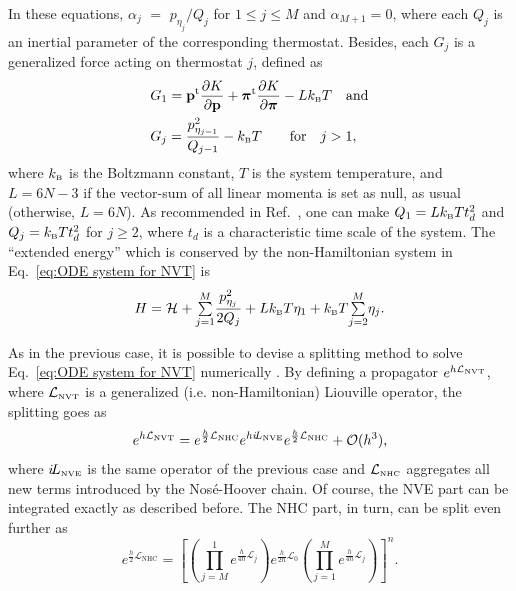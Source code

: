 \documentclass[journal=jctcce,manuscript=article,layout=twocolumn]{achemso}
\newcommand{\vt}[1]{\boldsymbol{\mathbf{#1}}}   %
\newcommand{\tr}[1]{#1^\text{t}}                %
\newcommand{\diff}[2]{\frac{\partial #1}{\partial #2}} %
\newcommand{\Ham}[1]{{\mathcal H}_\text{#1}}    %
\newcommand{\Liu}[1]{i\!L_\text{#1}}            %
\newcommand{\timestep}{h}
\newcommand{\modified}[1]{\widetilde{#1}}
\begin{document}
In these equations, $\alpha_j$ $=$ ${p_{\eta_j}}/{Q_j}$ for $1 \leq j \le M$ and $\alpha_{M+1} = 0$, where each $Q_j$ is an inertial parameter of the corresponding thermostat. Besides, each $G_j$ is a generalized force acting on thermostat $j$, defined as
\begin{subequations}
\begin{align}
\label{eq:generalized force NVT}
&G_1 = \tr{\vt p} \diff{K}{\vt p} + \tr{\vt \pi} \diff{K}{\vt \pi} - L k_\text{\tiny B} T \quad \text{and}\\
&G_j = \frac{p_{\eta_{j-1}}^2}{Q_{j-1}} - k_\text{\tiny B} T  \qquad \text{for} \quad j > 1,
\end{align}
\end{subequations}
where $k_\text{\tiny B}$ is the Boltzmann constant, $T$ is the system temperature, and $L = 6N-3$ if the vector-sum of all linear momenta is set as null, as usual (otherwise, $L = 6N$).\cite{Martyna_1994} As recommended in Ref.~, one can make $Q_1 = L k_\text{\tiny B} T t_d^2$ and $Q_j = k_\text{\tiny B} T t_d^2$ for $j \geq 2$, where $t_d$ is a characteristic time scale of the system.
The ``extended energy'' which is conserved by the non-Hamiltonian system in Eq.~\eqref{eq:ODE system for NVT} is \cite{Martyna_1992}
\begin{equation}
\label{eq:nvt extended energy}
H = \Ham{} + {\textstyle\sum\limits_{j=1}^{M}} \frac{p_{\eta_j}^2}{2Q_j} + L k_\text{\tiny B} T\eta_1 + k_\text{\tiny B} T {\textstyle\sum\limits_{j=2}^{M}} \eta_j.
\end{equation}

As in the previous case, it is possible to devise a splitting method to solve Eq.~\eqref{eq:ODE system for NVT} numerically \cite{Tuckerman_2010}. By defining a propagator $e^{\timestep \mathcal{L}_\text{\tiny NVT}}$, where $\mathcal{L}_\text{\tiny NVT}$ is a generalized (i.e. non-Hamiltonian) Liouville operator, the splitting goes as
\begin{equation}
\label{eq:splitting NVT}
e^{\timestep \mathcal{L}_\text{\tiny NVT}} = e^{\frac{\timestep}{2} \mathcal{L}_\text{\tiny NHC}} e^{\timestep \Liu{\tiny NVE}} e^{\frac{\timestep}{2} \mathcal{L}_\text{\tiny NHC}} + \mathcal{O}(\timestep^3),
\end{equation}
where $\Liu{\tiny NVE}$ is the same operator of the previous case and $\mathcal{L}_\text{\tiny NHC}$ aggregates all new terms introduced by the Nos\'e-Hoover chain. Of course, the NVE part can be integrated exactly as described before. The NHC part, in turn, can be split even further as
\begin{equation*}
e^{\frac{\timestep}{2} \mathcal{L}_\text{NHC}} = \left[ \left( \textstyle\prod\limits_{j=M}^1 e^{\frac{\timestep}{4n} \mathcal{L}_j }\right) e^{\frac{\timestep}{2n} \mathcal{L}_0 } \left(  \textstyle\prod\limits_{j=1}^M e^{\frac{\timestep}{4n} \mathcal{L}_j }\right)  \right]^n.
\end{equation*}
\end{document}
